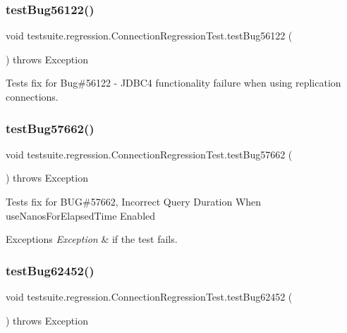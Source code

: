 \subsubsection{\texorpdfstring{test\+Bug56122()}{testBug56122()}}
{\footnotesize\ttfamily void testsuite.\+regression.\+Connection\+Regression\+Test.\+test\+Bug56122 (\begin{DoxyParamCaption}{ }\end{DoxyParamCaption}) throws Exception}

Tests fix for Bug\#56122 -\/ J\+D\+B\+C4 functionality failure when using replication connections. \mbox{\label{classtestsuite_1_1regression_1_1_connection_regression_test_a17f3b11b2a832994194387aa1ebc110e}} 
\subsubsection{\texorpdfstring{test\+Bug57662()}{testBug57662()}}
{\footnotesize\ttfamily void testsuite.\+regression.\+Connection\+Regression\+Test.\+test\+Bug57662 (\begin{DoxyParamCaption}{ }\end{DoxyParamCaption}) throws Exception}

Tests fix for B\+UG\#57662, Incorrect Query Duration When use\+Nanos\+For\+Elapsed\+Time Enabled


\begin{DoxyExceptions}{Exceptions}
{\em Exception} & if the test fails. \\
\hline
\end{DoxyExceptions}
\mbox{\label{classtestsuite_1_1regression_1_1_connection_regression_test_a622960dd50328718a00cdad9f046f1d9}} 
\subsubsection{\texorpdfstring{test\+Bug62452()}{testBug62452()}}
{\footnotesize\ttfamily void testsuite.\+regression.\+Connection\+Regression\+Test.\+test\+Bug62452 (\begin{DoxyParamCaption}{ }\end{DoxyParamCaption}) throws Exception}

